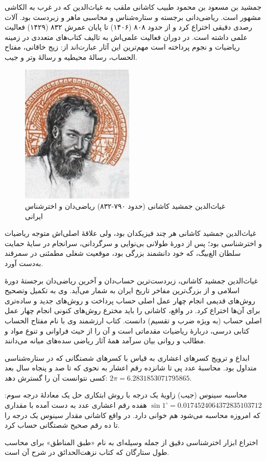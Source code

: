 \documentclass[a4paper,12pt]{article}
\begin{document}
جمشید بن مسعود بن محمود طبیب کاشانی ملقب به غیاث‌الدین که در غرب به الکاشی  مشهور است. ریاضی‌دانی برجسته و ستاره‌شناس و محاسبی ماهر و زبردست بود. آلات رصدی دقیقی اختراع کرد و از حدود ۸۰۸ (۱۴۰۶) تا پایان عمرش ۸۳۲ (۱۴۲۹) فعالیت علمی داشته است. در دوران فعالیت علمی‌اش به تالیف کتاب‌های متعددی در زمینه ریاضیات و نجوم پرداخته است مهم‌ترین این آثار عبارت‌اند از: زیج خاقانی، مفتاح الحساب، رسالهٔ محیطیه و رسالهٔ وتر و جیب.

\begin{figure}
  \begin{center}
    \includegraphics[width=0.48\textwidth]{ghjk}
  \end{center}
  \caption{غیاث‌الدین جمشید کاشانی (حدود ۷۹۰-۸۳۲) ریاضی‌دان و اخترشناس ایرانی}
\end{figure}

غیاث‌الدین جمشید کاشانی هر چند فیزیکدان بود، ولی علاقهٔ اصلی‌اش متوجه ریاضیات و اخترشناسی بود؛ پس از دورهٔ طولانی بی‌نوایی و سرگردانی، سرانجام در سایهٔ حمایت سلطان الغ‌بیگ، که خود دانشمند بزرگی بود، موقعیت شغلی مطمئنی در سمرقند به‌دست آورد.

غیاث‌الدین جمشید کاشانی، زبردست‌ترین حساب‌دان و آخرین ریاضی‌دان برجستهٔ دورهٔ اسلامی و از بزرگ‌ترین مفاخر تاریخ ایران به شمار می‌آید. وی به تکمیل وتصحیح روش‌های قدیمی انجام چهار عمل اصلی حساب پرداخت و روش‌های جدید و ساده‌تری برای آن‌ها اختراع کرد. در واقع، کاشانی را باید مخترع روش‌های کنونی انجام چهار عمل اصلی حساب (به ویژه ضرب و تقسیم) دانست. کتاب ارزشمند وی با نام مفتاح الحساب کتابی درسی، دربارهٔ ریاضیات مقدماتی است و آن را از حیث فراوانی و تنوع مواد و مطالب و روانی بیان سرآمد همهٔ آثار ریاضی سده‌های میانه می‌دانند.

ابداع و ترویج کسرهای اعشاری به قیاس با کسرهای شصتگانی که در ستاره‌شناسی متداول بود. محاسبهٔ عدد پی تا شانزده رقم اعشار به نحوی که تا صد و پنجاه سال بعد کسی نتوانست آن را گسترش دهد:  $2\pi=6.2831853071795865$.

محاسبه سینوس (جیب) زاویهٔ یک درجه با روش ابتکاری حل یک معادلهٔ درجه سوم: $\sin 1^\circ=0.0174524064372835103712$ هفده رقم اعشاری عدد به دست آمده با مقداری که امروزه محاسبه می‌شود هم خوانی دارد. در واقع کاشانی مقدار سینوس یک درجه را تا ده رقم صحیح شصتگانی حساب کرد.

اختراع ابزار اخترشناسی دقیق از جمله وسیله‌ای به نام «طبق المناطق» برای محاسب طول ستارگان که کتاب نزهت‌الحدائق در شرح آن است.
\end{document}
